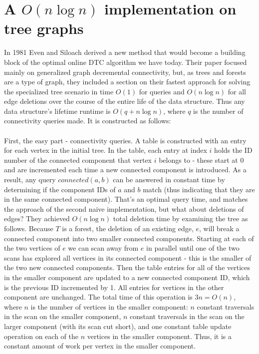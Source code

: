 \documentclass{article}
\begin{document}
\section{A $O(n\log n)$ implementation on tree graphs}

In 1981 Even and Siloach \cite{Shiloach} derived a new method that would become a building block of the optimal online DTC algorithm we have today. Their paper focused mainly on generalized graph decremental connectivity, but, as trees and forests are a type of graph, they included a section on their fastest approach for solving the specialized tree scenario in time $O(1)$ for queries and $O(n \log n)$ for all edge deletions over the course of the entire life of the data structure. Thus any data structure's lifetime runtime is $O(q + n \log n)$, where $q$ is the number of connectivity queries made. It is constructed as follows: \\ \\
First, the easy part - connectivity queries. A table is constructed with an entry for each vertex in the initial tree. In the table, each entry at index $i$ holds the ID number of the connected component that vertex $i$ belongs to - these start at 0 and are incremented each time a new connected component is introduced. As a result, any query $connected(a,b)$ can be answered in constant time by determining if the component IDs of $a$ and $b$ match (thus indicating that they are in the same connected component). That's an optimal query time, and matches the approach of the second naive implementation, but what about deletions of edges? They achieved $O(n \log n)$ total deletion time by examining the tree as follows.  Because $T$ is a forest, the deletion of an existing edge, $e$, will break a connected component into two smaller connected components. Starting at each of the two vertices of $e$ we can scan away from $e$ in parallel until one of the two scans has explored all vertices in its connected component - this is the smaller of the two new connected components. Then the table entries for all of the vertices in the smaller component are updated to a new connected component ID, which is the previous ID incremented by 1. All entries for vertices in the other component are unchanged. The total time of this operation is $3n = O(n)$, where $n$ is the number of vertices in the smaller component: $n$ constant traversals in the scan on the smaller component, $n$ constant traversals in the scan on the larger component (with its scan cut short), and one constant table update operation on each of the $n$ vertices in the smaller component. Thus, it is a constant amount of work per vertex in the smaller component. \\ \\
\end{document}
